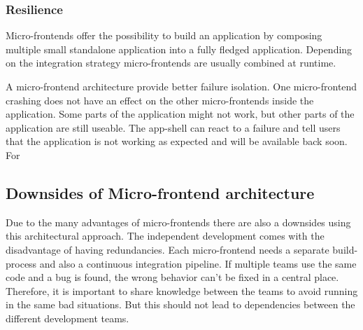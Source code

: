 \subsubsection{Resilience}

Micro-frontends offer the possibility to build an application by composing multiple small standalone application into a fully fledged application. Depending on the integration strategy micro-frontends are usually combined at runtime. 

A micro-frontend architecture provide better failure isolation. One micro-frontend crashing does not have an effect on the other micro-frontends inside the application. Some parts of the application might not work, but other parts of the application are still useable. The app-shell can react to a failure and tell users that the application is not working as expected and will be available back soon. For

\subsection{Downsides of Micro-frontend architecture}

Due to the many advantages of micro-frontends there are also a downsides using this architectural approach. The independent development comes with the disadvantage of having redundancies. Each micro-frontend needs a separate build-process and also a continuous integration pipeline. If multiple teams use the same code and a bug is found, the wrong behavior can't be fixed in a central place. Therefore, it is important to share knowledge between the teams to avoid running in the same bad situations. But this should not lead to dependencies between the different development teams.
\cite{book:2020:geers:background:micro-frontends:micro-frontends-in-action} 






